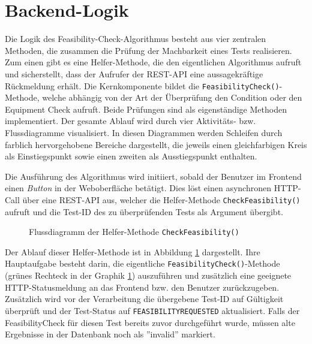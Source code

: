 \section{Backend-Logik}\label{Sec:Backend-Logik}

Die Logik des Feasibility-Check-Algorithmus besteht aus vier zentralen Methoden, die zusammen die Prüfung der Machbarkeit eines Tests realisieren. Zum einen gibt es eine Helfer-Methode, die den eigentlichen Algorithmus aufruft und sicherstellt, dass der Aufrufer der REST-API eine aussagekräftige Rückmeldung erhält. Die Kernkomponente bildet die \texttt{FeasibilityCheck()}-Methode, welche abhängig von der Art der Überprüfung den Condition oder den Equipment Check aufruft. Beide Prüfungen sind als eigenständige Methoden implementiert. Der gesamte Ablauf wird durch vier Aktivitäts- bzw. Flussdiagramme visualisiert. In diesen Diagrammen werden Schleifen durch farblich hervorgehobene Bereiche dargestellt, die jeweils einen gleichfarbigen Kreis als Einstiegspunkt sowie einen zweiten als Ausstiegspunkt enthalten.

Die Ausführung des Algorithmus wird initiiert, sobald der Benutzer im Frontend einen \textit{Button} in der Weboberfläche betätigt. Dies löst einen asynchronen HTTP-Call über eine REST-API aus, welcher die Helfer-Methode \texttt{CheckFeasibility()} aufruft und die Test-ID des zu überprüfenden Tests als Argument übergibt.

\begin{figure}[!htbp]
    \centering
    \caption{Flussdiagramm der Helfer-Methode \texttt{CheckFeasibility()}}
    \label{fig:feasibility-http-call-method}
\end{figure}

Der Ablauf dieser Helfer-Methode ist in Abbildung \ref{fig:feasibility-http-call-method} dargestellt. Ihre Hauptaufgabe besteht darin, die eigentliche \texttt{FeasibilityCheck()}-Methode (grünes Rechteck in der Graphik \ref{fig:feasibility-http-call-method}) auszuführen und zusätzlich eine geeignete HTTP-Statusmeldung an das Frontend bzw. den Benutzer zurückzugeben. Zusätzlich wird vor der Verarbeitung die übergebene Test-ID auf Gültigkeit überprüft und der Test-Status auf \texttt{FEASIBILITYREQUESTED} aktualisiert. Falls der FeasibilityCheck für diesen Test bereits zuvor durchgeführt wurde, müssen alte Ergebnisse in der Datenbank noch als ''invalid'' markiert.



